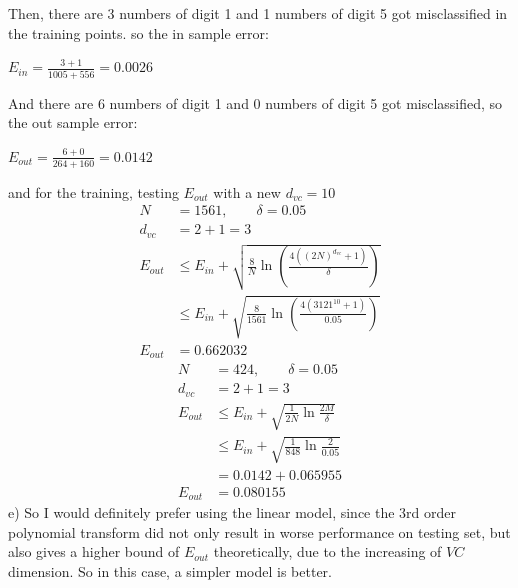 \documentclass[12pt]{article}
\begin{document}
Then, there are 3 numbers of digit 1 and 1 numbers of digit 5 got misclassified in the training points. so the in sample error:
\begin{center}
$\displaystyle E_{in} = \frac{3+1}{1005+556} = 0.0026$
\end{center}
And there are 6 numbers of digit 1 and 0 numbers of digit 5 got misclassified, so the out sample error:
\begin{center}
$\displaystyle E_{out} = \frac{6+0}{264+160} = 0.0142$
\end{center}
and for the training, testing $E_{out}$ with a new $d_{vc} = 10$
\begin{align*}\displaystyle
	N &= 1561, \qquad \delta = 0.05 \\
	d_{vc} &= 2+1 = 3 \\
	E_{out} & \leq E_{in} + \sqrt{ \frac{8}{N}\ln\left(\frac{4( (2N)^{d_{vc}}+1 )}{\delta}\right) } \\
	& \leq E_{in} + \sqrt{ \frac{8}{1561}\ln\left(\frac{4( 3121^{10}+1 )}{0.05}\right) } \\
        E_{out} &  = 0.662032
\end{align*}
\begin{align*}\displaystyle
	N &= 424, \qquad \delta = 0.05 \\
	d_{vc} &= 2+1 = 3 \\
	E_{out} & \leq E_{in}+\sqrt{\frac{1}{2N}\ln \frac{2M}{\delta}}\\
	& \leq E_{in}+\sqrt{\frac{1}{848}\ln \frac{2}{0.05}}\\ 
	& = 0.0142 + 0.065955 \\
	E_{out} & =  0.080155
\end{align*}
e) So I would definitely prefer using the linear model, since the 3rd order polynomial transform did not only result in worse performance on testing set, but also gives a higher bound of $E_{out}$ theoretically, due to the increasing of $VC$ dimension. So in this case, a simpler model is better. \\\\\\\\
\end{document}
